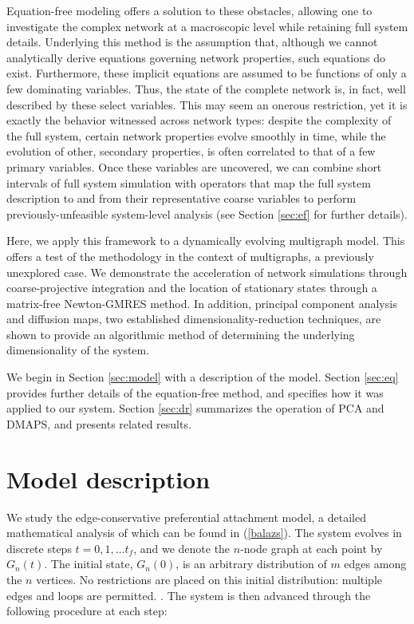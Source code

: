 \documentclass[12pt]{article}
\newcommand\ignore[1]{}
\begin{document}
\begin{onehalfspace}
Equation-free modeling offers a solution to these obstacles\ignore{circumvents these obstacles}, allowing one to investigate the complex network at a macroscopic level while retaining full system details. Underlying this method is the assumption that, although we cannot analytically derive equations governing network properties, such equations do exist. Furthermore, these implicit equations are assumed to be functions of only a few dominating variables. Thus, the state of the complete network is, in fact, well described by these select variables. This may seem an onerous restriction, yet it is exactly the behavior witnessed across network types: despite the complexity of the full system, certain network properties evolve smoothly in time, while the evolution of other, secondary properties, is often correlated to that of a few primary variables. Once these variables are uncovered, we can combine short intervals of full system simulation with operators that map the full system description to and from their representative coarse variables to perform previously-unfeasible system-level analysis (see Section \ref{sec:ef} for further details).\par

Here, we apply this framework to a dynamically evolving multigraph model. This offers a test of the methodology in the context of multigraphs, a previously unexplored case. We demonstrate the acceleration of network simulations through coarse-projective integration and the location of stationary states through a matrix-free Newton-GMRES method. In addition, principal component analysis and diffusion maps, two established dimensionality-reduction techniques, are shown to provide an algorithmic method of determining the underlying dimensionality of the system. \par

We begin in Section \ref{sec:model} with a description of the model. Section \ref{sec:eq} provides further details of the equation-free method, and specifies how it was applied to our system. Section \ref{sec:dr} summarizes the operation of PCA and DMAPS, and presents related results.


\section{Model description}
\label{sec:m}

We study the edge-conservative preferential attachment model, a detailed mathematical analysis of which can be found in (\ref{balazs}). The system evolves in discrete steps $t = 0,1,\ldots t_f$, and we denote the $n$-node graph at each point by $G_n(t)$. The initial state, $G_n(0)$, is an arbitrary distribution of $m$ edges among the $n$ vertices. No restrictions are placed on this initial distribution: multiple edges and loops are permitted. \ignore{an Erd\H{o}s-R\'{e}nyi random graph on $n$ vertices and $m$ edges. Here, however, $m$ may be larger than the total number of edges in a completely-connected $n$-vertex graph so we cannot assign a probability to each edges existence, instead placing $m$ edges at random in the graph}. The system is then advanced through the following procedure at each step:


\end{onehalfspace}
\end{document}
